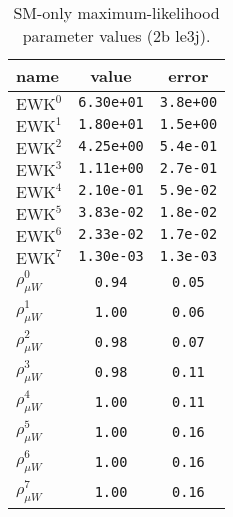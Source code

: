 %

\begin{table}\centering
\caption{SM-only maximum-likelihood parameter values (2b le3j).}
\label{tab:mlParameterValues2b_le3j}
\begin{tabular}{lcc}name & value & error \\ \hline
$\mathrm{EWK}^{0}$ & {\tt  6.30e+01} & {\tt  3.8e+00}\\
$\mathrm{EWK}^{1}$ & {\tt  1.80e+01} & {\tt  1.5e+00}\\
$\mathrm{EWK}^{2}$ & {\tt  4.25e+00} & {\tt  5.4e-01}\\
$\mathrm{EWK}^{3}$ & {\tt  1.11e+00} & {\tt  2.7e-01}\\
$\mathrm{EWK}^{4}$ & {\tt  2.10e-01} & {\tt  5.9e-02}\\
$\mathrm{EWK}^{5}$ & {\tt  3.83e-02} & {\tt  1.8e-02}\\
$\mathrm{EWK}^{6}$ & {\tt  2.33e-02} & {\tt  1.7e-02}\\
$\mathrm{EWK}^{7}$ & {\tt  1.30e-03} & {\tt  1.3e-03}\\
$\rho_{\mu W}^{0}$ & {\tt 0.94} & {\tt 0.05}\\
$\rho_{\mu W}^{1}$ & {\tt 1.00} & {\tt 0.06}\\
$\rho_{\mu W}^{2}$ & {\tt 0.98} & {\tt 0.07}\\
$\rho_{\mu W}^{3}$ & {\tt 0.98} & {\tt 0.11}\\
$\rho_{\mu W}^{4}$ & {\tt 1.00} & {\tt 0.11}\\
$\rho_{\mu W}^{5}$ & {\tt 1.00} & {\tt 0.16}\\
$\rho_{\mu W}^{6}$ & {\tt 1.00} & {\tt 0.16}\\
$\rho_{\mu W}^{7}$ & {\tt 1.00} & {\tt 0.16}\\
\hline
\end{tabular}
\end{table}
%